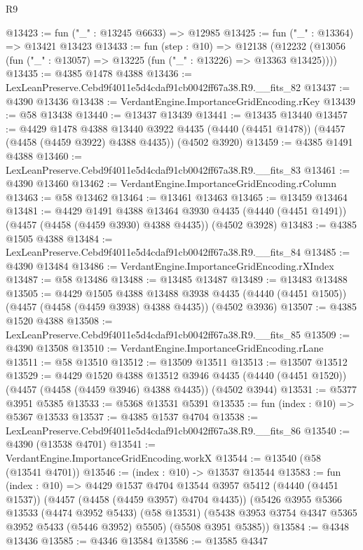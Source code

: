 \begin{lexlean}{R9}
\begin{coremodule}
@13423 := fun ("_" : @13245 @6633) => @12985
@13425 := fun ("_" : @13364) => @13421 @13423
@13433 := fun (step : @10) =>
  @12138 (@12232 (@13056 (fun ("_" : @13057) => @13225 (fun ("_" : @13226) => @13363 @13425))))
@13435 := @4385 @1478 @4388
@13436 := LexLeanPreserve.Cebd9f4011e5d4cdaf91cb0042ff67a38.R9.__fits_82
@13437 := @4390 @13436
@13438 := VerdantEngine.ImportanceGridEncoding.rKey
@13439 := @58 @13438
@13440 := @13437 @13439
@13441 := @13435 @13440
@13457 := @4429
    @1478
    @4388
    @13440
    @3922
    @4435
    (@4440 (@4451 @1478))
    (@4457 (@4458 (@4459 @3922) @4388 @4435))
    (@4502 @3920)
@13459 := @4385 @1491 @4388
@13460 := LexLeanPreserve.Cebd9f4011e5d4cdaf91cb0042ff67a38.R9.__fits_83
@13461 := @4390 @13460
@13462 := VerdantEngine.ImportanceGridEncoding.rColumn
@13463 := @58 @13462
@13464 := @13461 @13463
@13465 := @13459 @13464
@13481 := @4429
    @1491
    @4388
    @13464
    @3930
    @4435
    (@4440 (@4451 @1491))
    (@4457 (@4458 (@4459 @3930) @4388 @4435))
    (@4502 @3928)
@13483 := @4385 @1505 @4388
@13484 := LexLeanPreserve.Cebd9f4011e5d4cdaf91cb0042ff67a38.R9.__fits_84
@13485 := @4390 @13484
@13486 := VerdantEngine.ImportanceGridEncoding.rXIndex
@13487 := @58 @13486
@13488 := @13485 @13487
@13489 := @13483 @13488
@13505 := @4429
    @1505
    @4388
    @13488
    @3938
    @4435
    (@4440 (@4451 @1505))
    (@4457 (@4458 (@4459 @3938) @4388 @4435))
    (@4502 @3936)
@13507 := @4385 @1520 @4388
@13508 := LexLeanPreserve.Cebd9f4011e5d4cdaf91cb0042ff67a38.R9.__fits_85
@13509 := @4390 @13508
@13510 := VerdantEngine.ImportanceGridEncoding.rLane
@13511 := @58 @13510
@13512 := @13509 @13511
@13513 := @13507 @13512
@13529 := @4429
    @1520
    @4388
    @13512
    @3946
    @4435
    (@4440 (@4451 @1520))
    (@4457 (@4458 (@4459 @3946) @4388 @4435))
    (@4502 @3944)
@13531 := @5377 @3951 @5385
@13533 := @5368 @13531 @5391
@13535 := fun (index : @10) => @5367 @13533
@13537 := @4385 @1537 @4704
@13538 := LexLeanPreserve.Cebd9f4011e5d4cdaf91cb0042ff67a38.R9.__fits_86
@13540 := @4390 (@13538 @4701)
@13541 := VerdantEngine.ImportanceGridEncoding.workX
@13544 := @13540 (@58 (@13541 @4701))
@13546 := (index : @10) -> @13537 @13544
@13583 := fun (index : @10) =>
  @4429
    @1537
    @4704
    @13544
    @3957
    @5412
    (@4440 (@4451 @1537))
    (@4457 (@4458 (@4459 @3957) @4704 @4435))
    (@5426
      @3955
      @5366
      @13533
      (@4474 @3952 @5433)
      (@58 @13531)
      (@5438 @3953 @3754 @4347 @5365 @3952 @5433 (@5446 @3952) @5505)
      (@5508 @3951 @5385))
@13584 := @4348 @13436
@13585 := @4346 @13584
@13586 := @13585 @4347

\end{coremodule}
\end{lexlean}

